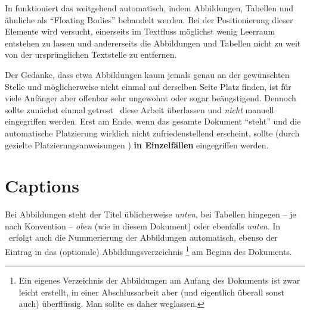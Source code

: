 In \latex funktioniert das weitgehend automatisch, indem
Abbildungen, Tabellen und ähnliche als "`Floating Bodies"'
behandelt werden. Bei der Positionierung dieser Elemente wird
versucht, einerseits im Textfluss möglichst wenig Leer\-raum
entstehen zu lassen und andererseits die Abbildungen und Tabellen
nicht zu weit von der ursprünglichen Textstelle zu entfernen.

Der Gedanke, dass etwa Abbildungen kaum jemals genau an der
ge\-wünsch\-ten Stelle und möglicherweise nicht einmal auf
derselben Seite Platz finden, ist für viele Anfänger aber offenbar sehr
ungewohnt oder sogar beängstigend. Dennoch sollte zunächst einmal
getrost \latex\ diese Arbeit überlassen und \emph{nicht} manuell
eingegriffen werden. Erst am Ende, wenn das gesamte Dokument "`steht"' und
die automatische Platzierung wirklich nicht zufriedenstellend erscheint, sollte (durch gezielte Platzierungsanweisungen
\cite[S.~49]{Oetiker2015}) \textbf{in Einzelfällen} eingegriffen werden.



\section{Captions}

Bei Abbildungen steht der Titel üblicherweise \emph{unten}, bei
Tabellen hingegen -- je nach Konvention -- \emph{oben} (wie in diesem Dokument) 
oder ebenfalls \emph{unten}. In \latex\ erfolgt
auch die Nummerierung der Abbildungen automatisch, ebenso der
Eintrag in das (optionale)
Abbildungsverzeichnis%
\footnote{Ein eigenes Verzeichnis der Abbildungen am Anfang des Dokuments
ist zwar leicht erstellt, in einer Abschlussarbeit aber (und eigentlich
überall sonst auch) überflüssig. Man sollte es daher weglassen.}
am Beginn des Dokuments.

